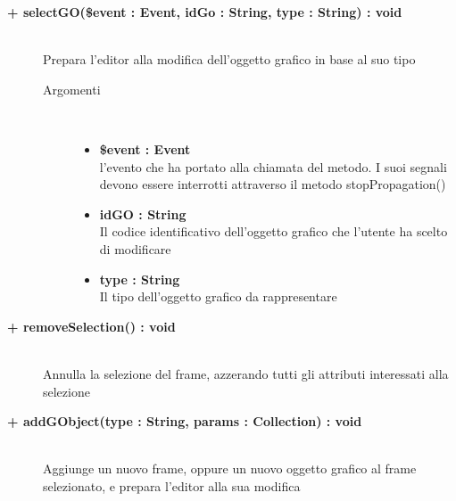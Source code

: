 \begin{description}
\begin{description}
	\end{description}
	
	\begin{description}
		\item[\textbf{\color{blue}+ selectGO(\$event : Event, idGo : String, type : String) : void 	}] \hfill \\
			Prepara l'editor alla modifica dell'oggetto grafico in base al suo tipo
			
		\begin{description}
			\item[Argomenti] \hfill \\
				\begin{itemize}
				
					\item \textbf{\$event : Event	} \hfill \\
					l'evento che ha portato alla chiamata del metodo. I suoi segnali devono essere interrotti attraverso il metodo stopPropagation()		
					\item \textbf{idGO : String	} \hfill \\
					Il codice identificativo dell'oggetto grafico che l'utente ha scelto di modificare
					\item \textbf{type : String	} \hfill \\
					Il tipo dell'oggetto grafico da rappresentare
				\end{itemize}
				
		\end{description}
	\end{description}
	
	\begin{description}
		\item[\textbf{\color{blue}+ removeSelection() : void	}] \hfill \\
			Annulla la selezione del frame, azzerando tutti gli attributi interessati alla selezione
		
	\end{description}
	
	
	\begin{description}
		\item[\textbf{\color{blue}+ addGObject(type : String, params : Collection) : void 	}] \hfill \\
			Aggiunge un nuovo frame, oppure un nuovo oggetto grafico al frame selezionato, e prepara l'editor alla sua modifica
			

\end{description}
\end{description}
